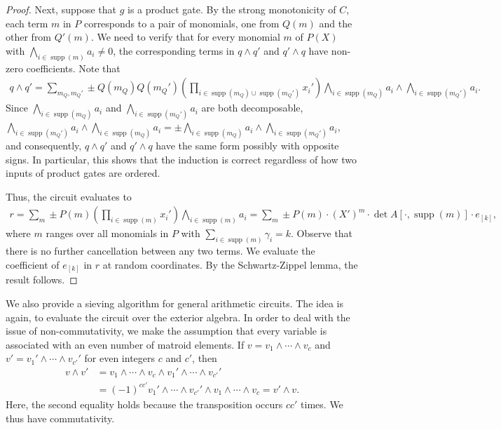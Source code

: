 \documentclass[10pt,a4paper]{article}
\DeclareMathOperator{\supp}{supp}
\begin{document}
\begin{proof}
  Next, suppose that $g$ is a product gate.
  By the strong monotonicity of $C$, each term $m$ in $P$ corresponds to a pair of monomials, one from $Q(m)$ and the other from $Q'(m)$.
  We need to verify that for every monomial $m$ of $P(X)$ with $\bigwedge_{i \in \supp(m)} a_i \ne 0$, the corresponding terms in $q \wedge q'$ and $q' \wedge q$ have non-zero coefficients.
  Note that
  \begin{align*}
    q \wedge q' = 
    \sum_{m_Q, m_Q'} \pm Q(m_Q) Q(m_Q') \left(\prod_{i \in \supp(m_Q) \cup \supp(m_Q')} x_i'\right) \bigwedge_{i \in \supp(m_Q)} a_i \wedge \bigwedge_{i \in \supp(m_Q')} a_i.
  \end{align*}
  Since $\bigwedge_{i \in \supp(m_Q)} a_i$ and $\bigwedge_{i \in \supp(m_Q')} a_i$ are both decomposable, $\bigwedge_{i \in \supp(m_Q')} a_i \wedge \bigwedge_{i \in \supp(m_Q)} a_i = \pm \bigwedge_{i \in \supp(m_Q)} a_i \wedge \bigwedge_{i \in \supp(m_Q')}a_i$, and consequently, $q \wedge q'$ and $q' \wedge q$ have the same form possibly with opposite signs.
  In particular, this shows that the induction is correct regardless of how two inputs of product gates are ordered. 

  Thus, the circuit evaluates to
  \begin{align*}
    r = \sum_{m} \pm P(m) \left(\prod_{i \in \supp(m)} x_i'\right) \bigwedge_{i \in \supp(m)} a_i
    = \sum_{m} \pm P(m) \cdot (X')^{m} \cdot \det A[\cdot, \supp(m)] \cdot e_{[k]},
  \end{align*}
  where $m$ ranges over all monomials in $P$ with $\sum_{i \in \supp(m)} \gamma_i = k$.
  Observe that there is no further cancellation between any two terms.
  We evaluate the coefficient of $e_{[k]}$ in $r$ at random coordinates.
  By the Schwartz-Zippel lemma, the result follows.
\end{proof}

We also provide a sieving algorithm for general arithmetic circuits.
The idea is again, to evaluate the circuit over the exterior algebra.
In order to deal with the issue of non-commutativity, we make the assumption that every variable is associated with an even number of matroid elements.
If $v = v_1 \wedge \cdots \wedge v_c$ and $v' = v_1' \wedge \cdots \wedge v_{c'}'$ for even integers $c$ and $c'$, then
\begin{align*}
  v \wedge v'
  &= v_1 \wedge \cdots \wedge v_c \wedge v_1' \wedge \cdots \wedge v_{c'}' \\
  &= (-1)^{cc'} v_1' \wedge \cdots \wedge v_{c'}' \wedge v_1 \wedge \cdots \wedge v_{c} = v' \wedge v.
\end{align*}
Here, the second equality holds because the transposition occurs $cc'$ times.
We thus have commutativity.
 
\end{document}
